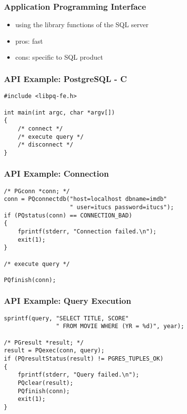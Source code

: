 \documentclass[dvipsnames]{beamer}
\theoremstyle{plain}
\begin{document}
\begin{frame}
  \frametitle{Application Programming Interface}

  \begin{itemize}
    \item using the library functions of the SQL server

    \bigskip
    \item pros: fast
    \item cons: specific to SQL product
  \end{itemize}
\end{frame}

\begin{frame}[fragile]
  \frametitle{API Example: PostgreSQL - C}

  \begin{lstlisting}
#include <libpq-fe.h>

int main(int argc, char *argv[])
{
    /* connect */
    /* execute query */
    /* disconnect */
}
  \end{lstlisting}
\end{frame}

\begin{frame}[fragile]
  \frametitle{API Example: Connection}

  \begin{lstlisting}
/* PGconn *conn; */
conn = PQconnectdb("host=localhost dbname=imdb"
                   " user=itucs password=itucs");
if (PQstatus(conn) == CONNECTION_BAD)
{
    fprintf(stderr, "Connection failed.\n");
    exit(1);
}

/* execute query */

PQfinish(conn);
  \end{lstlisting}
\end{frame}

\begin{frame}[fragile]
  \frametitle{API Example: Query Execution}

  \begin{lstlisting}
sprintf(query, "SELECT TITLE, SCORE"
               " FROM MOVIE WHERE (YR = %d)", year);

/* PGresult *result; */
result = PQexec(conn, query);
if (PQresultStatus(result) != PGRES_TUPLES_OK)
{
    fprintf(stderr, "Query failed.\n");
    PQclear(result);
    PQfinish(conn);
    exit(1);
}
  \end{lstlisting}
\end{frame}
\end{document}
